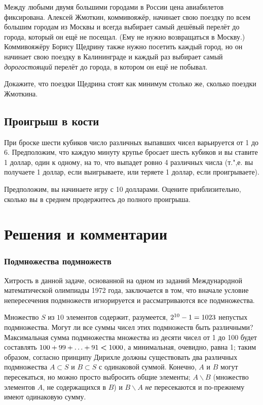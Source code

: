 \documentclass[twoside]{book}
\makeatletter
\newcommand{\rindex}[2][\imki@jobname]{%
  \index[#1]{\detokenize{#2}}%
}
\makeatother
\begin{document}
Между любыми двумя большими городами в России цена авиабилетов фиксирована.
Алексей Жмоткин, коммивояжёр, начинает свою поездку по всем большим городам из Москвы и всегда выбирает самый дешёвый перелёт до города, который он ещё не посещал.
(Ему не нужно возвращаться в Москву.)
Коммивояжёру Борису Щедрину также нужно посетить каждый город, но он начинает свою поездку в Калининграде и каждый раз выбирает самый \emph{дорогостоящий} перелёт до города, в котором он ещё не побывал.

Докажите, что поездки Щедрина стоят как минимум столько же, сколько поездки Жмоткина.

\subsection*{Проигрыш в кости}%
\rindex{Проигрыш в кости}

При броске шести кубиков число различных выпавших чисел варьируется от 1 до 6.
Предположим, что каждую минуту крупье бросает шесть кубиков
и вы ставите 1 доллар, один к одному, на то, что выпадет ровно 4 различных числа
(т.",е. вы получаете 1 доллар, если выигрываете, или теряете 1 доллар, если проигрываете).

Предположим, вы начинаете игру с 10 долларами.
Оцените приблизительно, сколько вы в среднем продержитесь до полного проигрыша.


\section*{Решения и комментарии}

\subsubsection*{Подмножества подмножеств}%

Хитрость в данной задаче, основанной на одном из заданий Международной математической олимпиады 1972 года, заключается в том, что вначале условие непересечения подмножеств игнорируется и рассматриваются все подмножества.


Множество $S$ из $10$ элементов содержит, разумеется, $2^{10} - 1 \z= 1023$ непустых подмножества.
Могут ли все суммы чисел этих подмножеств быть различными?
Максимальная сумма подмножества множества из десяти чисел от 1 до 100 будет составлять 
$100+99+\ldots+91\hm<1000$, а минимальная, очевидно, равна 1; таким образом, согласно принципу Дирихле должны существовать два различных подмножества $A\subset S$ и $B\subset S$ 
с одинаковой суммой.
Конечно, $A$ и $B$ могут пересекаться, но можно просто выбросить общие элементы;
$A\backslash B$ (множество элементов $A$, не содержащихся в $B$) и $B\backslash A$ \emph{не} пересекаются и по-прежнему имеют одинаковую сумму.\heart
\end{document}
